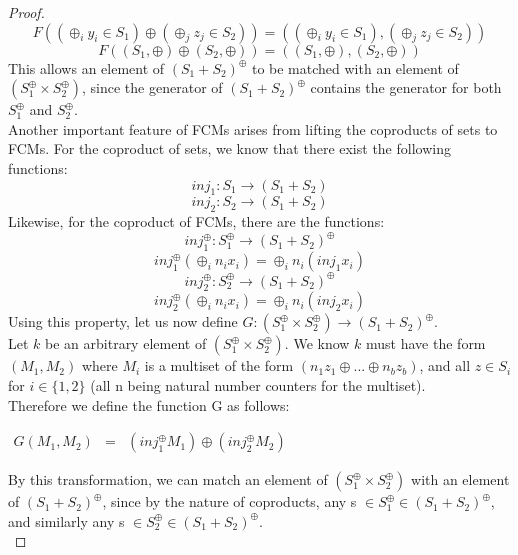 \begin{lemma}
\begin{proof}
\[F((\oplus_i y_i \in S_1) \oplus (\oplus_j z_j \in S_2)) = ((\oplus_i y_i \in S_1), (\oplus_j z_j \in S_2))\]
\[F((S_1, \oplus) \oplus (S_2, \oplus)) = ((S_1, \oplus), (S_2, \oplus))\]
This allows an element of $(S_1 + S_2)^\oplus$ to be matched with an element of $(S_1 ^\oplus \times S_2 ^\oplus)$, since the generator of $(S_1 + S_2)^\oplus$ contains the generator for both $S_1^\oplus$ and $S_2^\oplus$.\bigskip\\ 
Another important feature of FCMs arises from lifting the coproducts of sets to FCMs. For the coproduct of sets, we know that there exist the following functions:\\
\[inj_1: S_1 \to (S_1 + S_2) \]
\[inj_2: S_2 \to (S_1 + S_2)\]
Likewise, for the coproduct of FCMs, there are the functions: \\
\[inj^\oplus_1: S_1^\oplus \to (S_1 + S_2)^\oplus  \]
\[inj^\oplus_1(\oplus_i n_i x_i) = \oplus_i n_i(inj_1 x_i)\]
\smallskip
\[inj^\oplus_2: S_2^\oplus \to (S_1 + S_2)^\oplus \]
\[ inj^\oplus_2(\oplus_i n_i x_i) = \oplus_i n_i(inj_2 x_i)\]
Using this property, let us now define $G: (S_1 ^\oplus \times S_2 ^\oplus) \to (S_1 + S_2)^\oplus$.\\
Let $k$ be an arbitrary element of $(S_1 ^\oplus \times S_2 ^\oplus)$. We know $k$ must have the form $(M_1 , M_2)$ where $M_i$ is a multiset of the form $(n_1z_1 \oplus ... \oplus n_bz_b)$, and all $z \in S_i$ for $i\in\{1, 2\}$ (all n being natural number counters for the multiset).\\
Therefore we define the function G as follows:\\
\begin{center}
  \begin{math}
    \begin{array}{lll}
       G(M_1, M_2) & = & (inj_1^\oplus M_1) \oplus (inj_2^\oplus M_2)
    \end{array}
  \end{math}
\end{center}
By this transformation, we can match an element of $(S_1 ^\oplus \times S_2 ^\oplus)$ with an element of $(S_1 + S_2)^\oplus$, since by the nature of coproducts, any s $\in S_1^\oplus \in (S_1+S_2)^\oplus$, and similarly any s $\in S_2^\oplus \in (S_1+S_2)^\oplus$.\bigskip \\


\end{proof}
\end{lemma}
